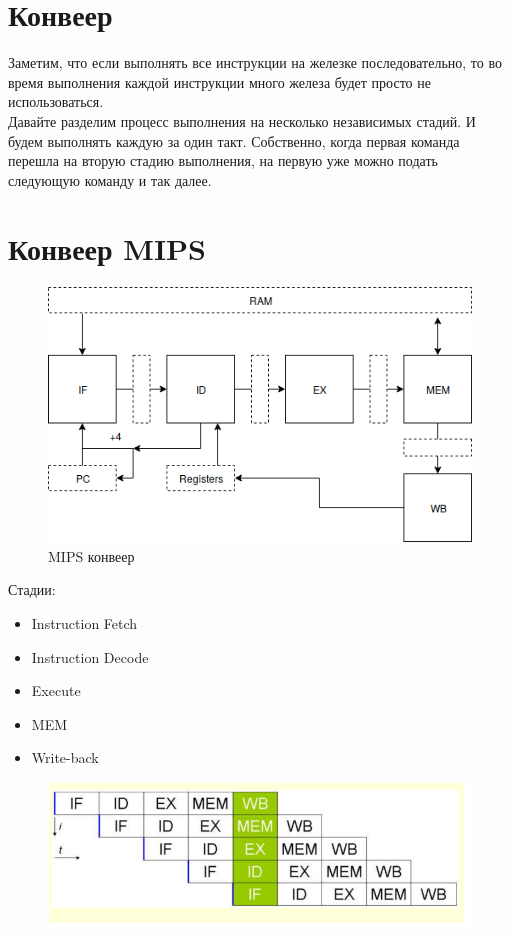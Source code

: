 \documentclass[12pt, a4paper]{article}
\begin{document}
\section{Конвеер}
Заметим, что если выполнять все инструкции на железке последовательно, то во время выполнения каждой инструкции много железа будет просто не использоваться.\\
Давайте разделим процесс выполнения на несколько независимых стадий. И будем выполнять каждую за один такт. Собственно, когда первая команда перешла на вторую стадию выполнения, на первую уже можно подать следующую команду и так далее.
\section{Конвеер MIPS}
\begin{figure}[h]
    \centering
    \includegraphics[width = 0.8\linewidth]{./images/MIPS.png}
    \caption{MIPS конвеер}
    \label{fig:MIPS}
\end{figure}
Стадии:
\begin{itemize}
    \item Instruction Fetch
    \item Instruction Decode
    \item Execute
    \item MEM
    \item Write-back
\end{itemize}
\begin{figure}[h]
    \centering
    \includegraphics[width=0.8\linewidth]{./images/pipe.png}
    \label{fig:pipe}
\end{figure}
\end{document}
